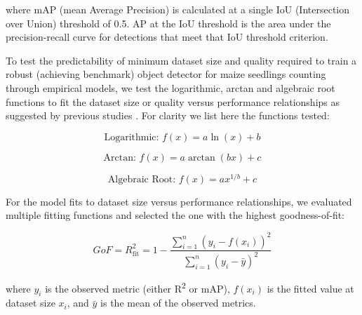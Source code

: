 \documentclass{article}
\begin{document}
where mAP (mean Average Precision) is calculated at a single IoU (Intersection over Union) 
threshold of 0.5.
AP at the IoU threshold is the area under the precision-recall curve for detections 
that meet that IoU threshold criterion.

To test the predictability of minimum dataset size and quality required to train a robust
(achieving benchmark) object detector for maize seedlings counting through empirical 
models, we test the logarithmic, arctan and algebraic root functions to fit the 
dataset size or quality versus performance relationships as suggested by previous
studies \cite{mahmoodHowMuchMore2022}. 
For clarity we list here the functions tested:

\begin{equation}
\text{Logarithmic: } f(x) = a \ln(x) + b
\end{equation}

\begin{equation}
\text{Arctan: } f(x) = a \arctan(bx) + c
\end{equation}

\begin{equation}
\text{Algebraic Root: } f(x) = a x^{1/b} + c
\end{equation}

For the model fits to dataset size versus performance relationships, we evaluated 
multiple fitting functions and selected the one with the highest goodness-of-fit:

\begin{equation}
\text{$GoF$} = R^2_{\text{fit}} = 1 - \frac{\sum_{i=1}^{n} (y_i - f(x_i))^2}{\sum_{i=1}^{n} (y_i - \bar{y})^2}
\end{equation}

where $y_i$ is the observed metric (either R\textsuperscript{2} or mAP), $f(x_i)$ is the 
fitted value at dataset size $x_i$, and $\bar{y}$ is the mean of the observed 
metrics.
\end{document}

